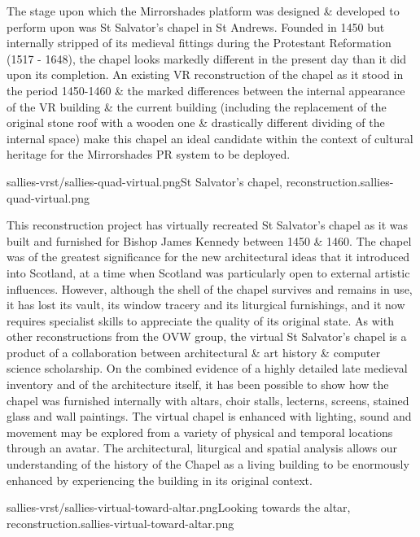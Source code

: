 The stage upon which the Mirrorshades platform was designed \& developed to perform upon was St Salvator's chapel in St Andrews. Founded in 1450 but internally stripped of its medieval fittings during the Protestant Reformation (1517 - 1648), the chapel looks markedly different in the present day than it did upon its completion. An existing VR reconstruction of the chapel as it stood in the period 1450-1460 \& the marked differences between the internal appearance of the VR building \& the current building (including the replacement of the original stone roof with a wooden one \& drastically different dividing of the internal space) make this chapel an ideal candidate within the context of cultural heritage for the Mirrorshades PR system to be deployed.

       {sallies-vrst/sallies-quad-virtual.png}{St Salvator's chapel, reconstruction.}{sallies-quad-virtual.png}
       
This reconstruction project has virtually recreated St Salvator’s chapel as it was built and furnished for Bishop James Kennedy between 1450 \& 1460. The chapel was of the greatest significance for the new architectural ideas that it introduced into Scotland, at a time when Scotland was particularly open to external artistic influences. However, although the shell of the chapel survives and remains in use, it has lost its vault, its window tracery and its liturgical furnishings, and it now requires specialist skills to appreciate the quality of its original state. As with other reconstructions from the OVW group, the virtual St Salvator's chapel is a product of a collaboration between architectural \& art history \& computer science scholarship. On the combined evidence of a highly detailed late medieval inventory and of the architecture itself, it has been possible to show how the chapel was furnished internally with altars, choir stalls, lecterns, screens, stained glass and wall paintings. The virtual chapel is enhanced with lighting, sound and movement may be explored from a variety of physical and temporal locations through an avatar. The architectural, liturgical and spatial analysis allows our understanding of the history of the Chapel as a living building to be enormously enhanced by experiencing the building in its original context.

       {sallies-vrst/sallies-virtual-toward-altar.png}{Looking towards the altar, reconstruction.}{sallies-virtual-toward-altar.png}

